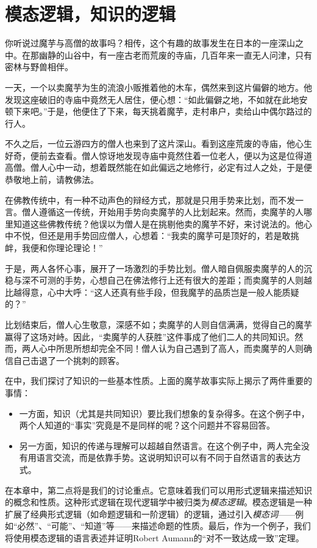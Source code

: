 \chapter{模态逻辑，知识的逻辑}\label{chap:modal-logic}

你听说过魔芋与高僧的故事吗？相传，这个有趣的故事发生在日本的一座深山之中。在那幽静的山谷中，有一座古老而荒废的寺庙，几百年来一直无人问津，只有密林与野兽相伴。

一天，一个以卖魔芋为生的流浪小贩推着他的木车，偶然来到这片偏僻的地方。他发现这座破旧的寺庙中竟然无人居住，便心想：“如此偏僻之地，不如就在此地安顿下来吧。”于是，他便住了下来，每天挑着魔芋，走村串户，卖给山中偶尔路过的行人。

不久之后，一位云游四方的僧人也来到了这片深山。看到这座荒废的寺庙，他心生好奇，便前去查看。僧人惊讶地发现寺庙中竟然住着一位老人，便以为这是位得道高僧。僧人心中一动，想着既然能在如此偏远之地修行，必定有过人之处，于是便恭敬地上前，请教佛法。

在佛教传统中，有一种不动声色的辩经方式，那就是只用手势来比划，而不发一言。僧人遵循这一传统，开始用手势向卖魔芋的人比划起来。然而，卖魔芋的人哪里知道这些佛教传统？他误以为僧人是在挑剔他卖的魔芋不好，来讨说法的。他心中不悦，但还是用手势回应僧人，心想着：“我卖的魔芋可是顶好的，若是敢挑衅，我便和你理论理论！”

于是，两人各怀心事，展开了一场激烈的手势比划。僧人暗自佩服卖魔芋的人的沉稳与深不可测的手势，心想自己在佛法修行上还有很大的差距；而卖魔芋的人则越比越得意，心中大呼：“这人还真有些手段，但我魔芋的品质岂是一般人能质疑的？”

比划结束后，僧人心生敬意，深感不如；卖魔芋的人则自信满满，觉得自己的魔芋赢得了这场对峙。因此，“卖魔芋的人获胜”这件事成了他们二人的共同知识。然而，两人心中所思所想却完全不同！僧人认为自己遇到了高人，而卖魔芋的人则确信自己击退了一个挑刺的顾客。

在中，我们探讨了知识的一些基本性质。上面的魔芋故事实际上揭示了两件重要的事情：
\begin{itemize}
    \item 一方面，知识（尤其是共同知识）要比我们想象的复杂得多。在这个例子中，两个人知道的“事实”究竟是不是同样的呢？这个问题并不容易回答。
    \item 另一方面，知识的传递与理解可以超越自然语言。在这个例子中，两人完全没有用语言交流，而是依靠手势。这说明知识可以有不同于自然语言的表达方式。
\end{itemize}

在本章中，第二点将是我们的讨论重点。它意味着我们可以用形式逻辑来描述知识的概念和性质。这种形式逻辑在现代逻辑学中被归类为\emph{模态逻辑}。模态逻辑是一种扩展了经典形式逻辑（如命题逻辑和一阶逻辑）的逻辑，通过引入\emph{模态词}——例如“必然”、“可能”、“知道”等——来描述命题的性质。最后，作为一个例子，我们将使用模态逻辑的语言表述并证明Robert Aumann的“对不一致达成一致”定理。

